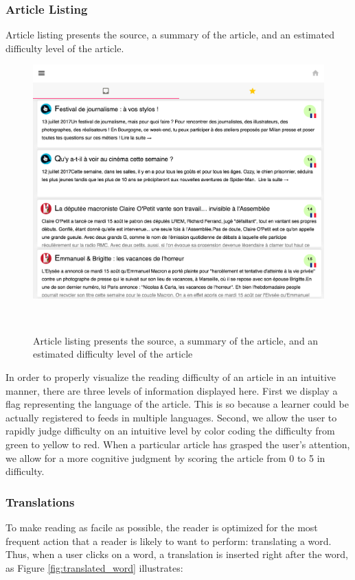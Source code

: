 \subsubsection{Article Listing}

Article listing presents the source, a summary of the article, and an estimated difficulty level of the article.

    \begin{figure}[h!]
    \centering
      \includegraphics[width=0.75\columnwidth]{figures/article_listing}
      \caption{Article listing presents the source, a summary of the article, and an estimated difficulty level of the article }~
      \label{fig:registrations}
    \end{figure}


In order to properly visualize the reading difficulty of an article in an intuitive manner, there are three levels of information displayed here. First we display a flag representing the language of the article. This is so because a learner could be actually registered to feeds in multiple languages. Second, we allow the user to rapidly judge difficulty on an intuitive level by color coding the difficulty from green to yellow to red. When a particular article has grasped the user's attention, we allow for a more cognitive judgment by scoring the article from 0 to 5 in difficulty.




\subsubsection{Translations}

To make reading as facile as possible, the reader is optimized for the most frequent action that a reader is likely to want to perform: translating a word. Thus, when a user clicks on a word, a translation is inserted right after the word, as Figure \ref{fig:translated_word} illustrates: 

